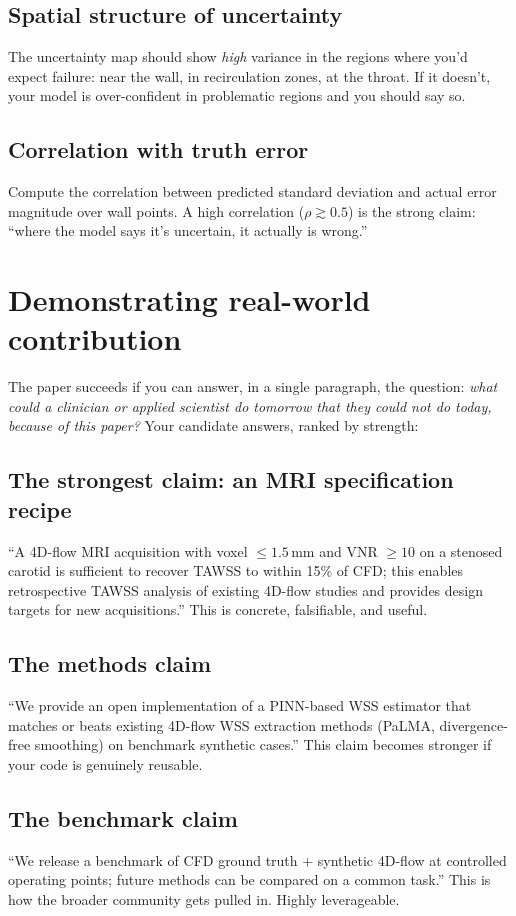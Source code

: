 \documentclass[11pt]{article}
\begin{document}
\subsection*{Spatial structure of uncertainty}
The uncertainty map should show \emph{high} variance in the regions where you'd expect failure: near the wall, in recirculation zones, at the throat. If it doesn't, your model is over-confident in problematic regions and you should say so.

\subsection*{Correlation with truth error}
Compute the correlation between predicted standard deviation and actual error magnitude over wall points. A high correlation ($\rho \gtrsim 0.5$) is the strong claim: ``where the model says it's uncertain, it actually is wrong.''

\section{Demonstrating real-world contribution}

The paper succeeds if you can answer, in a single paragraph, the question: \emph{what could a clinician or applied scientist do tomorrow that they could not do today, because of this paper?} Your candidate answers, ranked by strength:

\subsection*{The strongest claim: an MRI specification recipe}
``A 4D-flow MRI acquisition with voxel $\leq 1.5$\,mm and VNR $\geq 10$ on a stenosed carotid is sufficient to recover TAWSS to within 15\% of CFD; this enables retrospective TAWSS analysis of existing 4D-flow studies and provides design targets for new acquisitions.'' This is concrete, falsifiable, and useful.

\subsection*{The methods claim}
``We provide an open implementation of a PINN-based WSS estimator that matches or beats existing 4D-flow WSS extraction methods (PaLMA, divergence-free smoothing) on benchmark synthetic cases.'' This claim becomes stronger if your code is genuinely reusable.

\subsection*{The benchmark claim}
``We release a benchmark of CFD ground truth + synthetic 4D-flow at controlled operating points; future methods can be compared on a common task.'' This is how the broader community gets pulled in. Highly leverageable.
\end{document}
